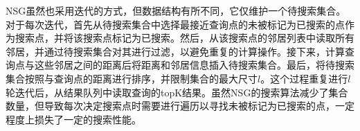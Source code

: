NSG虽然也采用迭代的方式，但数据结构有所不同，它仅维护一个待搜索集合。对于每次迭代，首先从待搜索集合中选择最接近查询点的未被标记为已搜索的点作为搜索点，并将该搜索点标记为已搜索。然后，从该搜索点的邻居列表中读取所有邻居，并通过待搜索集合对其进行过滤，以避免重复的计算操作。接下来，计算查询点与这些邻居之间的距离后将距离和邻居信息插入待搜索集合。最后，将待搜索集合按照与查询点的距离进行排序，并限制集合的最大尺寸$l$。这个过程重复进行$l$轮迭代后，从结果队列中读取查询的topK结果。虽然NSG的搜索算法减少了集合数量，但导致每次决定搜索点时需要进行遍历以寻找未被标记为已搜索的点，一定程度上损失了一定的搜索性能。






